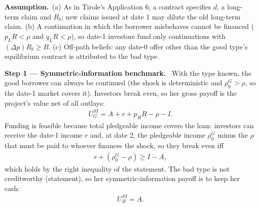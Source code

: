 \documentclass[11pt,a4paper]{article}
\newcommand{\step}[2]{\par\medskip\noindent\textbf{Step #1 --- #2.}~}
\newcommand{\assume}{\par\smallskip\noindent\textbf{Assumption.}~}
\begin{document}
\assume (a) As in Tirole's Application 6, a contract specifies $d$, a long-term claim and $R_b$; new claims
issued at date 1 may dilute the old long-term claim. (b) A continuation in which the borrower misbehaves
cannot be financed ($p_LR<\rho$ and $q_LR<\rho$), so date-1 investors fund only continuations with
$(\Delta p)R_b\ge B$. (c) Off-path beliefs: any date-0 offer other than the good type's equilibrium
contract is attributed to the bad type.

\step{1}{Symmetric-information benchmark} With the type known, the good borrower can always be continued
(the shock is deterministic and $\rho_0^G>\rho$, so the date-1 market covers it). Investors break even, so
her gross payoff is the project's value net of all outlays:
\begin{align}
  U_G^{SI} = A + r + p_HR - \rho - I. \label{t3e10-USI}
\end{align}
Funding is feasible because total pledgeable income covers the loan: investors can receive the date-1 income $r$ and, at date 2, the pledgeable income $\rho_0^G$ minus the $\rho$ that must be paid to whoever finances the shock, so they break even iff
\begin{align}
  r+(\rho_0^G-\rho)\ge I-A, \nonumber
\end{align}
which holds by the right inequality of the statement. The bad type is not creditworthy (statement), so her
symmetric-information payoff is to keep her cash:
\begin{align}
  U_B^{SI} = A. \label{t3e10-UBSI}
\end{align}
\end{document}
